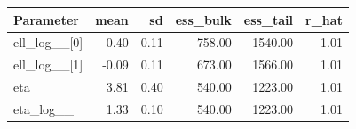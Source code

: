 \begin{table}[htbp]
\centering
{}
\label{tab:hsgp_ca_params}
\small
\begin{tabular}{lrrrrr}
\toprule
\textbf{Parameter} & \textbf{mean} & \textbf{sd} & \textbf{ess\_bulk} & \textbf{ess\_tail} & \textbf{r\_hat} \\
\midrule
ell\_log\_\_[0] & -0.40 & 0.11 & 758.00 & 1540.00 & 1.01 \\
ell\_log\_\_[1] & -0.09 & 0.11 & 673.00 & 1566.00 & 1.01 \\
eta & 3.81 & 0.40 & 540.00 & 1223.00 & 1.01 \\
eta\_log\_\_ & 1.33 & 0.10 & 540.00 & 1223.00 & 1.01 \\
\bottomrule
\end{tabular}
\end{table}
